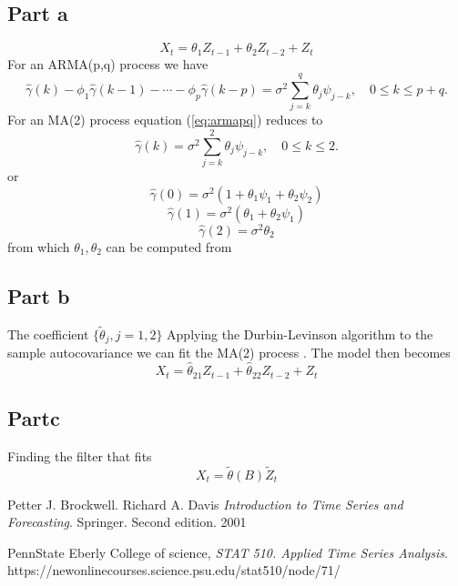 \documentclass[11pt, oneside]{article}   	%
\begin{document}
\subsection{Part a}
\begin{equation}
X_{t} = \theta_{1}Z_{t-1} + \theta_{2}Z_{t-2} + Z_{t}
\end{equation}
For an ARMA(p,q) process we  have
\begin{equation}\label{eq:armapq}
\hat{\gamma}(k)-\phi_{1}\hat{\gamma}(k-1)-\cdots-\phi_{p}\hat{\gamma}(k-p) = \sigma^{2}\sum_{j=k}^{q}\theta_{j}\psi_{j-k}, \quad 0 \leq k \leq p+q.
\end{equation}
For an MA(2) process equation (\ref{eq:armapq}) reduces to 
\begin{equation}\label{eq:maq}
\hat{\gamma}(k) = \sigma^{2}\sum_{j=k}^{2}\theta_{j}\psi_{j-k}, \quad 0 \leq k \leq 2.
\end{equation}
or
\begin{equation}\label{eq:maq1}
\hat{\gamma}(0) = \sigma^{2}(1+ \theta_{1}\psi_{1} + \theta_{2}\psi_{2})
\end{equation}
\begin{equation}\label{eq:maq2}
\hat{\gamma}(1) = \sigma^{2}( \theta_{1} + \theta_{2}\psi_{1})
\end{equation}
\begin{equation}\label{eq:maq3}
\hat{\gamma}(2) = \sigma^{2} \theta_{2}
\end{equation}
from which $\theta_{1}, \theta_{2}$ can be computed from

\subsection{Part b}
The coefficient $\{\tilde{\theta}_{j}, j=1,2\}$ Applying the Durbin-Levinson algorithm to the sample autocovariance we can fit the MA(2) process \cite{petter}. The model then becomes
\begin{equation}
X_{t} = \hat{\theta}_{21}Z_{t-1} +  \hat{\theta}_{22}Z_{t-2} + Z_{t}
\end{equation}

\subsection{Partc}
Finding the filter that fits 
\begin{equation}
X_{t} = \tilde{\theta}(B)\tilde{Z}_{t}
\end{equation}

\begin{thebibliography}{9}
Petter J. Brockwell. Richard A. Davis
\textit{Introduction to Time Series and Forecasting}. 
Springer. Second edition. 2001

PennState Eberly College of science, 
\textit{STAT 510. Applied Time Series Analysis}. 
https://newonlinecourses.science.psu.edu/stat510/node/71/
 
\end{thebibliography}
\end{document}
